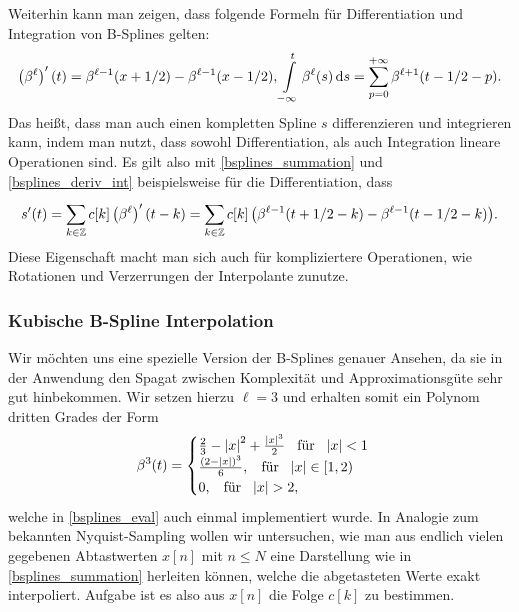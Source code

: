 Weiterhin kann man zeigen, dass folgende Formeln f\"ur Differentiation und Integration von B-Splines gelten:
\begin{equation}\label{bsplines_deriv_int}
    \left(\beta^\ell\right)^\prime(t) =
        \beta^{\ell-1}(x + 1/2) - \beta^{\ell-1}(x - 1/2), 
    {\int\limits_{-\infty}^{t}{\beta^\ell(s)}\,\mathrm{d}{s}} = 
        {\sum\limits_{p = 0}^{+\infty}{\beta^{\ell+1}(t - 1/2 - p)}}.
\end{equation}
Das hei{\ss}t, dass man auch einen kompletten Spline $s$ differenzieren und integrieren kann, indem man nutzt, dass sowohl Differentiation, als auch Integration lineare Operationen sind. Es gilt also mit \eqref{bsplines_summation} und \eqref{bsplines_deriv_int} beispielsweise f\"ur die Differentiation, dass
\begin{equation}
    s^\prime(t) = {\sum\limits_{k \in \mathbb{Z}}^{}{
        c[k] \left(\beta^{\ell}\right)^\prime(t - k)
    }}
    = {\sum\limits_{k \in \mathbb{Z}}^{}{
        c[k]\left(
            \beta^{\ell-1}(t + 1/2 - k) - \beta^{\ell-1}(t - 1/2 - k)
        \right)
    }}.
\end{equation}
%
Diese Eigenschaft macht man sich auch f\"ur kompliziertere Operationen, wie Rotationen und Verzerrungen der Interpolante zunutze.
%
%
\subsubsection{Kubische B-Spline Interpolation}
%
%
Wir m\"ochten uns eine spezielle Version der B-Splines genauer Ansehen, da sie in der Anwendung den Spagat zwischen Komplexit\"at und Approximationsg\"ute sehr gut hinbekommen. Wir setzen hierzu $\ell=3$ und erhalten somit ein Polynom dritten Grades der Form
\begin{equation}
    \beta^3(t) = \begin{cases}
        \frac 23 - {\left| x \right|}^2 + \frac{{\left| x \right|}^3}{2} {\hspace{3mm} \text{f\"ur} \hspace{3mm}} {\left| x \right|} < 1\\
        \frac{(2 - {\left| x \right|})^3}{6}, {\hspace{3mm} \text{f\"ur} \hspace{3mm}} {\left| x \right|} \in [1, 2) \\
        0, {\hspace{3mm} \text{f\"ur} \hspace{3mm}} {\left| x \right|} > 2,
    \end{cases}
\end{equation}
welche in \cref{bsplines_eval} auch einmal implementiert wurde. In Analogie zum bekannten Nyquist-Sampling wollen wir untersuchen, wie man aus endlich vielen gegebenen Abtastwerten $x[n]$ mit $n \leqslant N$ eine Darstellung wie in \eqref{bsplines_summation} herleiten k\"onnen, welche die abgetasteten Werte exakt interpoliert. Aufgabe ist es also aus $x[n]$ die Folge $c[k]$ zu bestimmen.

